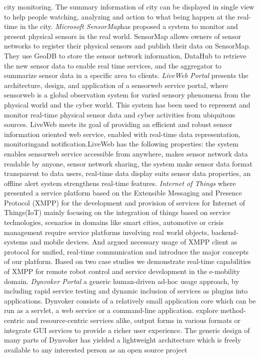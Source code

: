 city monitoring. The summary information of city can be displayed in single view to help people watching, analyzing and action to what being happen at the real-time in the city.
\newline
\emph{Microsoft SensorMap\cite{nath2007sensormap}}has proposed a system to monitor and
present physical sensors in the real world. SensorMap allows owners of sensor networks to register their physical sensors and publish their data on SensorMap. They use GeoDB to store the
sensor network information, DataHub to retrieve the new sensor data to enable real time services, and the
aggregator to summarize sensor data in a specific area to clients.
\newline
 \emph{LiveWeb Portal}\cite{yang2011liveweb} presents the architecture, design, and application of a
sensorweb service portal, where sensorweb is a global observation system for varied sensory phenomena from
the physical world and the cyber world. This system has been used to represent and monitor
real-time physical sensor data and cyber activities from ubiquitous sources. LiveWeb meets its goal of providing an efficient and robust sensor information oriented web service, enabled with real-time data representation, monitoringand notification.LiveWeb has the following properties: the system
enables sensorweb service accessible from anywhere, makes sensor network data readable by
anyone, sensor network sharing, the system make sensor data format transparent to data users, real-time data display suits sensor data properties, an offline alert system strengthens real-time features.
\newline
\emph{Internet of Things}\cite{bendel2013service} where presented a service platform based on the Extensible Messaging and Presence Protocol (XMPP) for the development and provision of services for
Internet of Things(IoT) mainly focusing on the integration of things based on service technologies, scenarios in domains like smart cities, automotive or crisis management require service
platforms involving real world objects, backend-systems and mobile devices. And argued necessary usage of
 XMPP client as protocol for unified, real-time communication and introduce the major concepts of our platform. Based on two case studies we demonstrate real-time capabilities of XMPP for remote robot control and service development in the e-mobility domain.
 \newline
 \emph{Dynvoker Portal}\cite{spillner2008ad} a generic human-driven ad-hoc usage approach, by including rapid service testing and dynamic inclusion of services as plugins into applications. Dynvoker consists of a relatively small application core which can be run as a servlet, a web service or a command-line application. explore method-centric and resource-centric services alike, output forms in various formats or integrate GUI services to provide a richer user experience. The generic design of many parts of Dynvoker has yielded a lightweight architecture which is freely available to any interested person as an open source project

